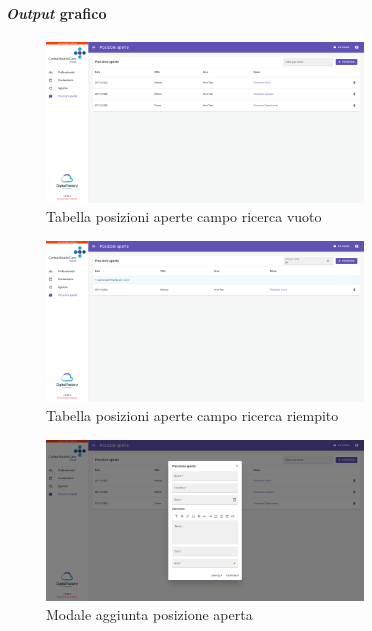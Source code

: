 \paragraph{\textit{Output} grafico}
\begin{figure}[H]
    \centering
    \includegraphics[width=0.75\textwidth]{images/capitolo5/f10_jobOpenPositions/PageJobOpenPositions_searchEmpty.png} 
    \caption{Tabella posizioni aperte campo ricerca vuoto} 
    \label{fig:PageJobOpenPositions_searchEmpty}
\end{figure}

\begin{figure}[H]
    \centering
    \includegraphics[width=0.75\textwidth]{images/capitolo5/f10_jobOpenPositions/PageJobOpenPositions_searchFilled.png} 
    \caption{Tabella posizioni aperte campo ricerca riempito} 
    \label{fig:PageJobOpenPositions_searchFilled}
\end{figure}

\begin{figure}[H]
    \centering
    \includegraphics[width=0.75\textwidth]{images/capitolo5/f10_jobOpenPositions/ModalJobOpenPosition_create.png} 
    \caption{Modale aggiunta posizione aperta} 
    \label{fig:ModalJobOpenPosition_create}
\end{figure}

